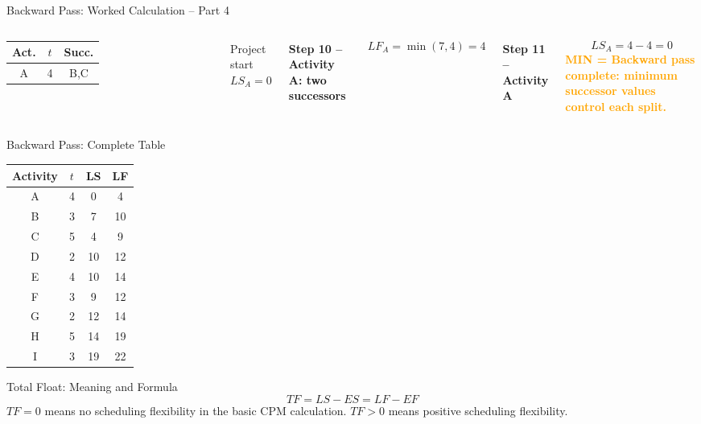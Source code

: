 \documentclass[aspectratio=169,10pt]{beamer}
\newcommand{\minmark}[1]{\textcolor{Orange}{\textbf{MIN = #1}}}
\newcommand{\teachstep}[1]{\par\medskip\noindent\textbf{#1}\par\smallskip}
\begin{document}
\begin{frame}{Backward Pass: Worked Calculation -- Part 4}
\begin{columns}[T,onlytextwidth]
\centering\scriptsize
\begin{tabular}{c|c|c}\toprule
Act.&$t$&Succ.\\\midrule
A&4&B,C\\\bottomrule
\end{tabular}
\vspace{0.12cm}
\begin{block}{Project start}
\centering $LS_A=0$
\end{block}
\footnotesize
\setlength{\abovedisplayskip}{2pt}\setlength{\belowdisplayskip}{2pt}
\teachstep{Step 10 -- Activity A: two successors}
\[
LF_A=\min(7,4)=\boxed{4}
\]
\pause
\teachstep{Step 11 -- Activity A}
\[
LS_A=4-4=\boxed{0}
\]
\pause
\minmark{Backward pass complete: minimum successor values control each split.}
\end{columns}
\end{frame}

\begin{frame}{Backward Pass: Complete Table}
\centering\small
\begin{tabular}{c|c|c|c}
\toprule Activity & $t$ & LS & LF\\\midrule
A&4&0&4\\B&3&7&10\\C&5&4&9\\D&2&10&12\\E&4&10&14\\F&3&9&12\\G&2&12&14\\H&5&14&19\\I&3&19&22\\\bottomrule
\end{tabular}
\end{frame}

\begin{frame}{Total Float: Meaning and Formula}
\[\boxed{TF=LS-ES=LF-EF}\]
\pause
$TF=0$ means no scheduling flexibility in the basic CPM calculation.
\pause
$TF>0$ means positive scheduling flexibility.
\end{frame}
\end{document}
